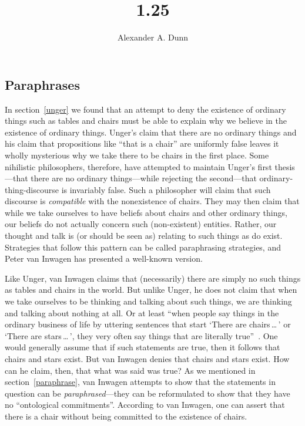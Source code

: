 \documentclass[11pt]{standalone}
\title{1.25}
\author{Alexander A. Dunn}
\begin{document}
\ifstandalone
\maketitle
\begin{spacing}{1.5}
\fi

\section{Paraphrases}
In section~\ref{unger} we found that an attempt to deny the existence
of ordinary things such as tables and chairs must be able to explain
why we believe in the existence of ordinary things.  Unger's claim
that there are no ordinary things and his claim that propositions like
``that is a chair'' are uniformly false leaves it wholly mysterious
why we take there to be chairs in the first place.  Some nihilistic
philosophers, therefore, have attempted to maintain Unger's first
thesis---that there are no ordinary things---while rejecting the
second---that ordinary-thing-discourse is invariably false.  Such a
philosopher will claim that such discourse is {\em compatible} with
the nonexistence of chairs.  They may then claim that while we take
ourselves to have beliefs about chairs and other ordinary things, our
beliefs do not actually concern such (non-existent) entities.  Rather,
our thought and talk is (or should be seen as) relating to such things
as do exist.  Strategies that follow this pattern can be called
paraphrasing strategies, and Peter van Inwagen has presented a
well-known version.

Like Unger, van Inwagen claims that (necessarily) there are simply no
such things as tables and chairs in the world.  But unlike Unger, he
does not claim that when we take ourselves to be thinking and talking
about such things, we are thinking and talking about nothing at all.
Or at least ``when people say things in the ordinary business of life
by uttering sentences that start `There are chairs\,\ldots\,' or
`There are stars\,\ldots\,', they very often say things that are
literally true''~\citep[102]{inwagen1995}.  One would generally assume
that if such statements are true, then it follows that chairs and
stars exist.  But van Inwagen denies that chairs and stars exist.  How
can he claim, then, that what was said was true?  As we mentioned in
section~\ref{paraphrase}, van Inwagen attempts to show that the
statements in question can be {\em paraphrased}---they can be
reformulated to show that they have no ``ontological commitments''.
According to van Inwagen, one can assert that there is a chair without
being committed to the existence of chairs.


\end{spacing}
\end{document}
